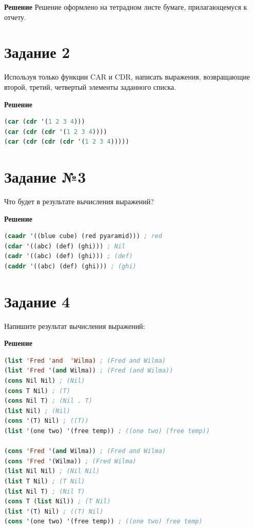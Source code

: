 \documentclass[12pt]{report}
\begin{document}
	\textbf{Решение}
	Решение оформлено на тетрадном листе бумаге, прилагающемуся к отчету.	
	
\section*{Задание 2}

Используя только функции CAR и CDR, написать выражения, возвращающие второй, третий, четвертый элементы заданного списка.
	
\textbf{Решение}

\begin{lstlisting}[label=first,caption=Решение задания №2, language=lisp]
(car (cdr '(1 2 3 4)))
(car (cdr (cdr '(1 2 3 4))))
(car (cdr (cdr (cdr '(1 2 3 4)))))
\end{lstlisting}

\section*{Задание №3}

Что будет в результате вычисления выражений?

\textbf{Решение}

\begin{lstlisting}[label=second,caption=Решение задания №3, language=lisp]
(caadr '((blue cube) (red pyaramid))) ; red
(cdar '((abc) (def) (ghi))) ; Nil
(cadr '((abc) (def) (ghi))) ; (def)
(caddr '((abc) (def) (ghi))) ; (ghi)
\end{lstlisting}

\section*{Задание 4}
Напишите результат вычисления выражений:

\textbf{Решение}

\begin{lstlisting}[label=second,caption=Решение задания №4, language=lisp]
(list 'Fred 'and  'Wilma) ; (Fred and Wilma)
(list 'Fred '(and Wilma)) ; (Fred (and Wilma))
(cons Nil Nil) ; (Nil)
(cons T Nil) ; (T)
(cons Nil T) ; (Nil . T)
(list Nil) ; (Nil)
(cons '(T) Nil) ; ((T))
(list '(one two) '(free temp)) ; ((one two) (free temp))

(cons 'Fred '(and Wilma)) ; (Fred and Wilma)
(cons 'Fred '(Wilma)) ; (Fred Wilma)
(list Nil Nil) ; (Nil Nil)
(list T Nil) ; (T Nil)
(list Nil T) ; (Nil T)
(cons T (list Nil)) ; (T Nil)
(list '(T) Nil) ; ((T) Nil)
(cons '(one two) '(free temp)) ; ((one two) free temp)
\end{lstlisting}
\end{document}
